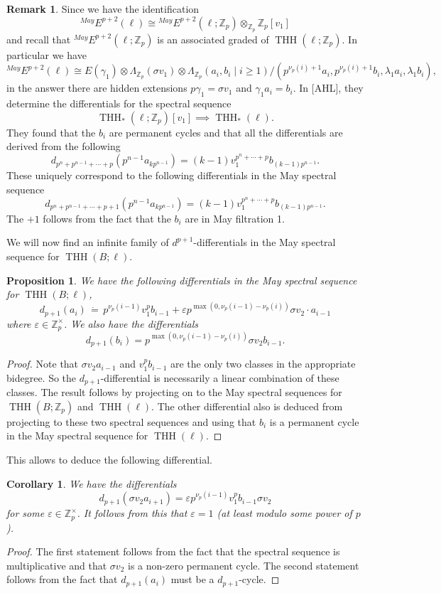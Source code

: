 \documentclass[12pt]{amsart}
\newcommand{\Z}{\mathbb{Z}}
\DeclareMathOperator{\THH}{THH}
\newcommand{\MayE}{\mbox{}^{May}E}
\newtheorem{cor}[equation]{Corollary}
\newtheorem{prop}[equation]{Proposition}
\theoremstyle{definition}
\newtheorem{rmk}[equation]{Remark}
\numberwithin{equation}{section}
\numberwithin{figure}{section}
\begin{document}
\begin{rmk}
	Since we have the identification 
	\[
	\MayE^{p+2}(\ell)\cong \MayE^{p+2}(\ell; \Z_p)\otimes_{\Z_p} \Z_p[v_1]
	\]
	and recall that $\MayE^{p+2}(\ell;\Z_p)$ is an associated graded of $\THH(\ell; \Z_p)$. In particular we have 
	\[
	\MayE^{p+2}(\ell)\cong E(\gamma_1)\otimes \Lambda_{\Z_p}(\sigma v_1)\otimes \Lambda_{\Z_p}(a_i, b_i\mid i\geq 1 )/(p^{\nu_p(i)+1}a_i, p^{\nu_p(i)+1}b_i, \lambda_1a_i, \lambda_1b_i),
	\]
	in the answer there are hidden extensions $p\gamma_1 = \sigma v_1$ and $\gamma_1a_i = b_i$. 
	In [AHL], they determine the differentials for the spectral sequence 
	\[
	\THH_*(\ell;\Z_p)[v_1]\implies \THH_*(\ell).
	\]
	They found that the $b_i$ are permanent cycles and that all the differentials are derived from the following
	\[
	d_{p^n+p^{n-1}+\cdots +p}(p^{n-1}a_{kp^{n-1}}) = (k-1)v_1^{p^n+\cdots +p} b_{(k-1)p^{n-1}}.
	\]
	These uniquely correspond to the following differentials in the May spectral sequence
	\[
	d_{p^n+p^{n-1}+\cdots +p+1}(p^{n-1}a_{kp^{n-1}}) = (k-1)v_1^{p^n+\cdots +p} b_{(k-1)p^{n-1}}.
	\]
	The $+1$ follows from the fact that the $b_i$ are in May filtration 1. 
\end{rmk}


We will now find an infinite family of $d^{p+1}$-differentials in the May spectral sequence for $\THH(B;\ell)$.

\begin{prop}
	We have the following differentials in the May spectral sequence for $\THH(B;\ell)$,
	\[
	d_{p+1}(a_i) \,\dot{=}\, p^{\nu_p(i-1)}v_1^{p} b_{i-1} + \varepsilon p^{\max(0, \nu_p(i-1)-\nu_p(i))}\sigma v_2 \cdot a_{i-1}
	\]
	where $\varepsilon\in \Z_p^\times$. We also have the differentials
	\[
	d_{p+1}(b_i) = p^{\max(0, \nu_{p}(i-1)-\nu_p(i))}\sigma v_2 b_{i-1}.
	\] 
\end{prop}
\begin{proof}
	Note that $\sigma v_2 a_{i-1}$ and $v_1^p b_{i-1}$ are the only two classes in the appropriate bidegree. So the $d_{p+1}$-differential is necessarily a linear combination of these classes. The result follows by projecting on to the May spectral sequences for $\THH(B; \Z_p)$ and $\THH(\ell)$. The other differential also is deduced from projecting to these two spectral sequences and using that $b_i$ is a permanent cycle in the May spectral sequence for $\THH(\ell)$.
\end{proof}

This allows to deduce the following differential. 

\begin{cor}
	We have the differentials
	\[
	d_{p+1}(\sigma v_2 a_{i+1}) = \varepsilon p^{\nu_p(i-1)}v_1^pb_{i-1}\sigma v_2
	\]
	for some $\varepsilon\in \Z_p^\times$. It follows from this that $\varepsilon=1$ (at least modulo some power of $p$).
\end{cor}
\begin{proof}
	The first statement follows from the fact that the spectral sequence is multiplicative and that $\sigma v_2$ is a non-zero permanent cycle. The second statement follows from the fact that $d_{p+1}(a_i)$ must be a $d_{p+1}$-cycle.
\end{proof}
\end{document}

